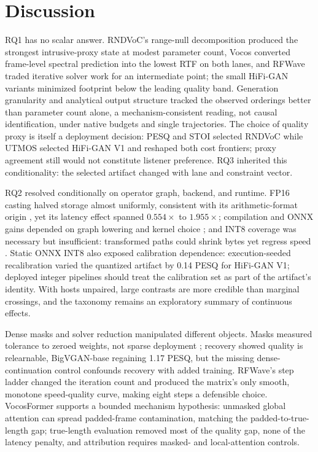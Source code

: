 \section{Discussion}
\label{sec:discussion}

RQ1 has no scalar answer.  RNDVoC's range-null
decomposition produced the strongest intrusive-proxy state at modest
parameter count, Vocos converted frame-level spectral prediction into the
lowest RTF on both lanes, and RFWave traded iterative solver work for an
intermediate point; the small HiFi-GAN variants minimized footprint below
the leading quality band.  Generation granularity and analytical output
structure tracked the observed orderings better than parameter count
alone, a mechanism-consistent reading, not causal identification, under
native budgets and single trajectories.  The choice of quality proxy is itself a deployment decision: PESQ
and STOI selected RNDVoC while UTMOS selected HiFi-GAN V1 and reshaped
both cost frontiers; proxy agreement still would not constitute listener
preference.  RQ3 inherited this conditionality: the selected artifact
changed with lane and constraint vector.

RQ2 resolved conditionally on operator graph, backend, and
runtime.  FP16 casting halved storage almost uniformly, consistent with its
arithmetic-format origin \citep{micikevicius2018mixedprecision}, yet its
latency effect spanned $0.554\times$ to $1.955\times$; compilation and ONNX
gains depended on graph lowering and kernel choice
\citep{ansel2024pytorch2}; and INT8 coverage was necessary but
insufficient: transformed paths could shrink bytes yet regress speed
\citep{jacob2018quantization}.  Static ONNX INT8 also exposed calibration
dependence: execution-seeded recalibration varied the quantized artifact
by 0.14 PESQ for HiFi-GAN V1; deployed integer pipelines should treat
the calibration set as part of the artifact's identity.  With hosts unpaired, large contrasts are more
credible than marginal crossings, and the taxonomy remains an exploratory
summary of continuous effects.

Dense masks and solver reduction manipulated different objects.  Masks
measured tolerance to zeroed weights, not sparse deployment
\citep{han2015pruning}; recovery showed quality is relearnable,
BigVGAN-base regaining 1.17 PESQ, but the missing dense-continuation
control confounds recovery with added training.  RFWave's step ladder
changed the iteration count and produced the matrix's only smooth,
monotone speed-quality curve, making eight steps a defensible choice.  VocosFormer supports a bounded mechanism hypothesis:
unmasked global attention can spread padded-frame contamination, matching
the padded-to-true-length gap; true-length evaluation removed most of
the quality gap, none of the latency penalty, and attribution requires
masked- and local-attention controls.

